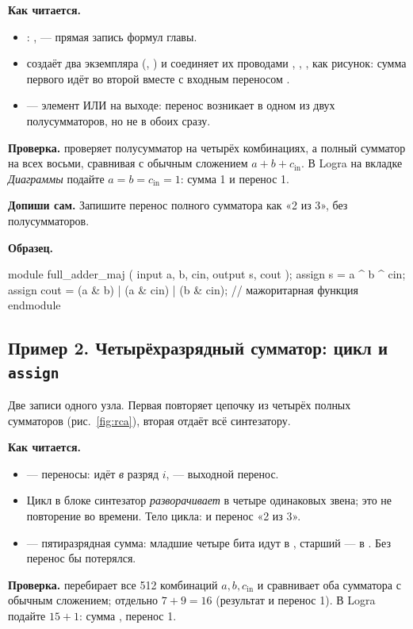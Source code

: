 \textbf{Как читается.}
\begin{itemize}
  \item {}: ,  --- прямая запись формул главы.
  \item {} создаёт два экземпляра  (, ) и соединяет их проводами , , , как рисунок: сумма первого идёт во второй вместе с входным переносом .
  \item {} --- элемент ИЛИ на выходе: перенос возникает в одном из двух полусумматоров, но не в обоих сразу.
\end{itemize}
\textbf{Проверка.}  проверяет полусумматор на четырёх
комбинациях, а полный сумматор на всех восьми, сравнивая  с
обычным сложением $a+b+c_\text{in}$. В Logra на вкладке \emph{Диаграммы}
подайте $a=b=c_\text{in}=1$: сумма 1 и перенос 1.

\textbf{Допиши сам.} Запишите перенос полного сумматора как «2 из 3», без
полусумматоров.

\textbf{Образец.}
\begin{vcode}
module full_adder_maj (
    input  a, b, cin,
    output s, cout
);
    assign s    = a ^ b ^ cin;
    assign cout = (a & b) | (a & cin) | (b & cin);   // мажоритарная функция
endmodule
\end{vcode}

\subsection{Пример 2. Четырёхразрядный сумматор: цикл и \texttt{assign}}

Две записи одного узла. Первая повторяет цепочку из четырёх полных сумматоров
(рис.~\ref{fig:rca}), вторая отдаёт всё синтезатору.


\textbf{Как читается.}
\begin{itemize}
  \item {} --- переносы:  идёт \emph{в} разряд $i$,  --- выходной перенос.
  \item Цикл  в блоке  синтезатор \emph{разворачивает} в четыре одинаковых звена; это не повторение во времени. Тело цикла:  и перенос «2 из 3».
  \item {} --- пятиразрядная сумма: младшие четыре бита идут в , старший --- в . Без  перенос бы потерялся.
\end{itemize}
\textbf{Проверка.}  перебирает все 512 комбинаций $a,b,c_\text{in}$
и сравнивает оба сумматора с обычным сложением; отдельно $7+9=16$ (результат
 и перенос 1). В Logra подайте $15+1$: сумма , перенос 1.

